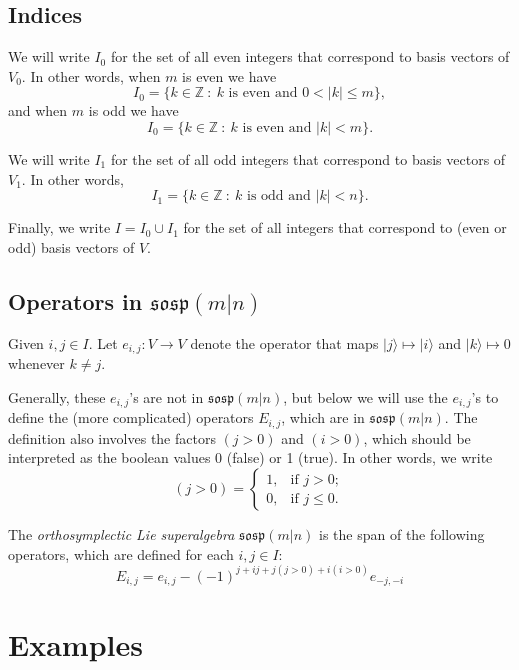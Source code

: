\documentclass{amsart}
\newcommand{\Z}{\mathbb{Z}}
\begin{document}
\subsection{Indices}

We will write $I_0$ for the set of all even integers that correspond to basis vectors of $V_0$. In other words, when $m$ is even we have 
\[I_0=\{k\in\Z~:~k\text{ is even and }0<|k|\leq m\},\]
and when $m$ is odd we have 
\[I_0=\{k\in\Z~:~k\text{ is even and } |k|< m\}.\]

We will write $I_1$ for the set of all odd integers that correspond to basis vectors of $V_1$. In other words, 
\[I_1=\{k\in\Z~:~k\text{ is odd and }|k|<n\}.\]

Finally, we write $I=I_0\cup I_1$ for the set of all integers that correspond to (even or odd) basis vectors of $V$.

\subsection{Operators in $\mathfrak{sosp}(m|n)$}

Given $i, j\in I$. Let $e_{i,j}:V\to V$ denote the operator that maps $|j\rangle\mapsto |i\rangle$ and $|k\rangle\mapsto 0$ whenever $k\not=j$. 

Generally, these $e_{i,j}$'s are not in $\mathfrak{sosp}(m|n)$, but below we will use the $e_{i,j}$'s to define the (more complicated) operators $E_{i,j}$, which are in $\mathfrak{sosp}(m|n)$. The definition also involves the factors $(j>0)$ and $(i>0)$, which should be interpreted as the boolean values 0 (false) or 1 (true). In other words, we write
\[(j>0)=\begin{cases}1,&\text{if }j>0;\\ 0,&\text{if }j\leq 0.\end{cases}\]



The \emph{orthosymplectic Lie superalgebra} $\mathfrak{sosp}(m|n)$ is the span of the following operators, which are defined for each $i, j\in I$:
\[E_{i,j}=e_{i,j}-(-1)^{j+ij+j(j>0)+i(i>0)}e_{-j, -i}\]

\section{Examples}
\end{document}
